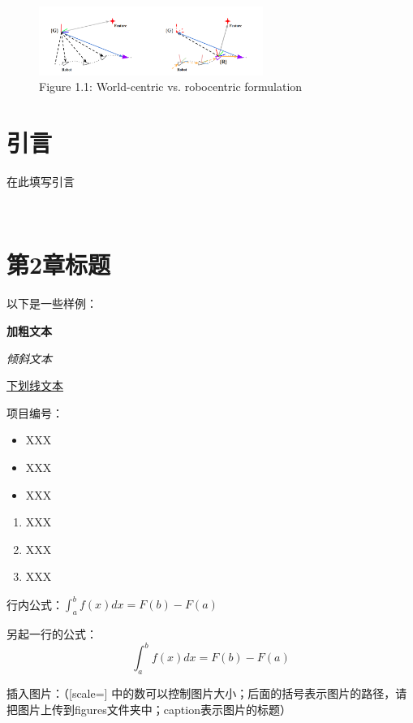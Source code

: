 \documentclass[a4paper, UTF8, fontset=adobe]{ctexart}
\begin{document}
	
\tableofcontents

\thispagestyle{empty}

\newpage

\begin{figure}
\centering
\includegraphics[width=0.65\textwidth]{figures/robocentric formulation illustration.png}
\caption{Figure 1.1: World-centric vs. robocentric formulation}
\end{figure}

\section{引言}

在此填写引言

\

\section{第2章标题}

以下是一些样例：

\textbf{加粗文本}

\textit{倾斜文本}

\underline{下划线文本}

项目编号：

\begin{itemize}
    \item XXX
    \item XXX
    \item XXX
\end{itemize}

\begin{enumerate}
    \item XXX
    \item XXX
    \item XXX
\end{enumerate}

行内公式：$\int_a^b f(x)dx = F(b)-F(a)$

另起一行的公式：
\begin{equation}
    \int_a^b f(x)dx = F(b)-F(a)
\end{equation}

插入图片：（[scale=] 中的数可以控制图片大小；后面的括号表示图片的路径，请把图片上传到figures文件夹中；caption表示图片的标题）
\end{document}
